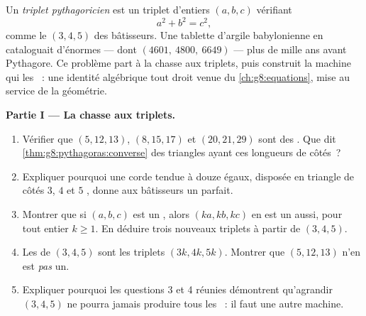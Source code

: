 \begin{problem}[{Devoir maison --- les triangles rectangles à côtés
entiers, et l'identité $(m^2 - n^2)^2 + (2mn)^2 = (m^2 + n^2)^2$ qui
les engendre tous}]
\label{pb:g8:pythagoras:1}
Un \emph{triplet pythagoricien} est un
triplet d'entiers $(a, b, c)$ vérifiant
\[
a^2 + b^2 = c^2 ,
\]
comme le $(3, 4, 5)$ des bâtisseurs. Une tablette d'argile
babylonienne en cataloguait d'énormes --- dont
$(4601,\ 4800,\ 6649)$ --- plus de mille ans avant Pythagore. Ce
problème part à la chasse aux triplets, puis construit la machine qui
les ~: une identité algébrique tout droit venue du
\cref{ch:g8:equations}, mise au service de la géométrie.

\medskip
\noindent\textbf{Partie I --- La chasse aux triplets.}
\begin{enumerate}
  \item Vérifier que $(5, 12, 13)$, $(8, 15, 17)$ et
        $(20, 21, 29)$ sont des . Que dit
        \cref{thm:g8:pythagoras:converse} des triangles ayant ces
        longueurs de côtés~?
  \item Expliquer pourquoi une corde tendue à douze  égaux,
        disposée en triangle de côtés $3$, $4$ et $5$ ,
        donne aux bâtisseurs un  parfait.
  \item Montrer que si $(a, b, c)$ est un ,
        alors $(ka, kb, kc)$ en est un aussi, pour tout entier
        $k \geq 1$. En déduire trois nouveaux triplets à partir de
        $(3, 4, 5)$.
  \item Les  de $(3, 4, 5)$ sont les triplets
        $(3k, 4k, 5k)$. Montrer que $(5, 12, 13)$ n'en est
        \emph{pas} un.
  \item Expliquer pourquoi les questions 3 et 4 réunies démontrent
        qu'agrandir $(3, 4, 5)$ ne pourra jamais produire tous les
        ~: il faut une autre machine.
\end{enumerate}


\end{problem}
